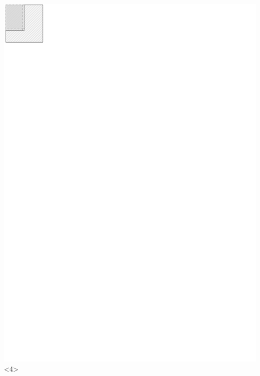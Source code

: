 \documentclass{beamer}
\begin{document}
\begin{frame}
\includegraphics[scale=1.5]{../img/walkingalg3.pdf}<4>
\end{frame}
\end{document}
